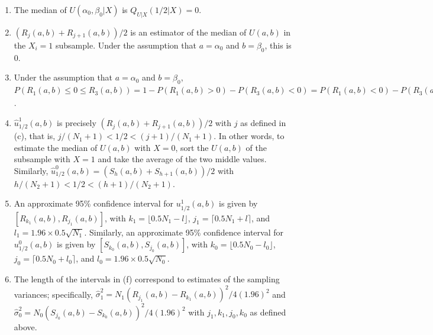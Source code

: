 \documentclass{article}
\begin{document}
\begin{enumerate}
\begin{enumerate}
		$\alpha_0$ is the earnings of an individual if they are male, and $\beta_0$ is the \textit{difference} in earnings an individual can expect if they are female from if they were male. If $\beta_0 = 0$, then the distributions of male and female earnings are the same.

		\item

		The median of $U(\alpha_0, \beta_0|X)$ is $Q_{U|X}(1/2|X) = 0$.

		\item

		$(R_j(a,b) + R_{j+1}(a,b))/2$ is an estimator of the median of $U(a,b)$ in the $X_i=1$ subsample. Under the assumption that $a = \alpha_0$ and $b = \beta_0$, this is 0.

		\item

		Under the assumption that $a = \alpha_0$ and $b = \beta_0$, $P(R_1(a,b) \leq 0 \leq R_3(a,b)) = 1 - P(R_1(a,b) > 0) - P(R_3(a,b) < 0) = P(R_1(a,b) < 0) - P(R_3(a,b) < 0) = \sum \limits_{i=1}^3 \binom{3}{i} (0.5)^{3-i}(0.5)^i -  (0.5)^3 = 2 \times 3(0.5)^3 = 0.75$.

		\item

		$\hat{u}_{1/2}^1(a,b)$ is precisely $(R_j(a,b) + R_{j+1}(a,b))/2$ with $j$ as defined in (c), that is, $j/(N_1 + 1) < 1/2 < (j+1)/(N_1+1)$. In other words, to estimate the median of $U(a,b)$ with $X=0$, sort the $U(a,b)$ of the subsample with $X=1$ and take the average of the two middle values. Similarly, $\hat{u}_{1/2}^0(a,b) = (S_h(a,b) + S_{h+1}(a,b))/2$ with $h/(N_2 + 1) < 1/2 < (h+1)/(N_2+1)$.

		\item

		An approximate 95\% confidence interval for $u_{1/2}^1(a,b)$ is given by $[R_{k_1}(a,b), R_{j_1}(a,b)]$, with $k_1 = \lfloor 0.5N_1 - l\rfloor$, $j_1 = \lceil 0.5N_1 + l\rceil$, and $l_1 = 1.96 \times 0.5\sqrt{N_1}$. Similarly, an approximate 95\% confidence interval for $u_{1/2}^0(a,b)$ is given by $[S_{k_0}(a,b), S_{j_0}(a,b)]$, with $k_0 = \lfloor 0.5N_0 - l_0\rfloor$, $j_0 = \lceil 0.5N_0 + l_0\rceil$, and $l_0 = 1.96 \times 0.5\sqrt{N_0}$. 

		\item 

		The length of the intervals in (f) correspond to estimates of the sampling variances; specifically, $\hat{\sigma}^2_1 = N_1(R_{j_1}(a,b) - R_{k_1}(a,b))^2/4(1.96)^2$ and $\hat{\sigma}^2_0 = N_0(S_{j_0}(a,b) - S_{k_0}(a,b))^2/4(1.96)^2$ with $j_1,k_1,j_0,k_0$ as defined above.


\end{enumerate}
\end{enumerate}
\end{document}
